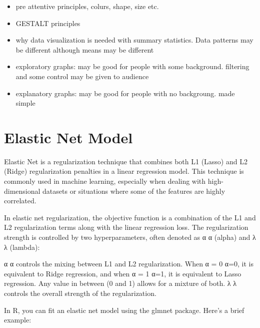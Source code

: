 \documentclass[
]{book}
\begin{document}
\begin{itemize}
\item
  pre attentive principles, colurs, shape, size etc.
\item
  GESTALT principles
\item
  why data visualization is needed with summary statistics. Data patterns may be different although means may be different
\item
  exploratory graphs: may be good for people with some background. filtering and some control may be given to audience
\item
  explanatory graphs: may be good for people with no backgroung. made simple
\end{itemize}

\hypertarget{elastic-net-model}{%
\section{Elastic Net Model}\label{elastic-net-model}}

Elastic Net is a regularization technique that combines both L1 (Lasso) and L2 (Ridge) regularization penalties in a linear regression model. This technique is commonly used in machine learning, especially when dealing with high-dimensional datasets or situations where some of the features are highly correlated.

In elastic net regularization, the objective function is a combination of the L1 and L2 regularization terms along with the linear regression loss. The regularization strength is controlled by two hyperparameters, often denoted as
α
α (alpha) and
λ
λ (lambda):

α
α controls the mixing between L1 and L2 regularization. When
α
=
0
α=0, it is equivalent to Ridge regression, and when
α
=
1
α=1, it is equivalent to Lasso regression. Any value in between (0 and 1) allows for a mixture of both.
λ
λ controls the overall strength of the regularization.

In R, you can fit an elastic net model using the glmnet package. Here's a brief example:
\end{document}
